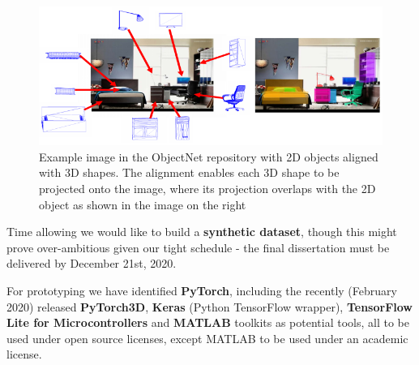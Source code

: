\begin{figure}[h]
 \centering 
 \includegraphics[width=\columnwidth]{figures/ObjectNet3D.png}
 \caption{Example image in the ObjectNet repository with 2D objects aligned with 3D shapes. The alignment enables each 3D shape to be projected onto the image, where its projection
overlaps with the 2D object as shown in the image on the right}
 \label{fig:ObjectNet3D}
\end{figure}  

Time allowing we would like to build a \textbf{synthetic dataset}, though this might prove over-ambitious given our tight schedule - the final dissertation must be delivered by December 21st, 2020.

For prototyping we have identified \textbf{PyTorch}, including the recently (February 2020) released \textbf{PyTorch3D}, \textbf{Keras} (Python TensorFlow wrapper), \textbf{TensorFlow Lite for Microcontrollers} and  \textbf{MATLAB} toolkits as potential tools, all to be used under open source licenses, except MATLAB to be used under an academic license.